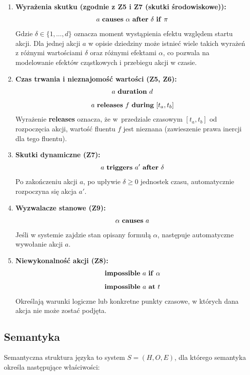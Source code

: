 \documentclass[12pt,a4paper]{article}
\begin{document}
\begin{enumerate}[label=\alph*)]
    \item \textbf{Wyrażenia skutku (zgodnie z Z5 i Z7 (skutki środowiskowe)):}
    \[ a \text{ \textbf{causes} } \alpha \text{ \textbf{after} } \delta \text{ \textbf{if} } \pi \]
    Gdzie $\delta \in \{1, \dots, d\}$ oznacza moment wystąpienia efektu względem startu akcji. 
    Dla jednej akcji $a$ w opisie dziedziny może istnieć wiele takich wyrażeń z różnymi wartościami $\delta$ oraz różnymi efektami $\alpha$, co pozwala na modelowanie efektów cząstkowych i przebiegu akcji w czasie.
    
    \item \textbf{Czas trwania i nieznajomość wartości (Z5, Z6):}
    \[ a \text{ \textbf{duration} } d \]
    \[ a \text{ \textbf{releases} } f \text{ \textbf{during} } [t_a, t_b] \]
    Wyrażenie \textbf{releases} oznacza, że w~przedziale czasowym $[t_a, t_b]$ od rozpoczęcia akcji, wartość fluentu $f$ jest nieznana (zawieszenie prawa inercji dla tego fluentu).

    \item \textbf{Skutki dynamiczne (Z7):}
    \[ a \text{ \textbf{triggers} } a' \text{ \textbf{after} } \delta \]
    Po zakończeniu akcji $a$, po upływie $\delta \geq 0$ jednostek czasu, automatycznie rozpoczyna się akcja $a'$.

    \item \textbf{Wyzwalacze stanowe (Z9):}
    \[ \alpha \text{ \textbf{causes} } a \]
    Jeśli w systemie zajdzie stan opisany formułą $\alpha$, następuje automatyczne wywołanie akcji $a$.

    \item \textbf{Niewykonalność akcji (Z8):}
    \[ \text{\textbf{impossible} } a \text{ \textbf{if} } \alpha \]
    \[ \text{\textbf{impossible} } a \text{ \textbf{at} } t \]
    Określają warunki logiczne lub konkretne punkty czasowe, w których dana akcja nie może zostać podjęta.
\end{enumerate}

\subsection{Semantyka}

Semantyczna struktura języka to system $S=(H,O,E)$, dla którego semantyka określa następujące właściwości:
\end{document}

